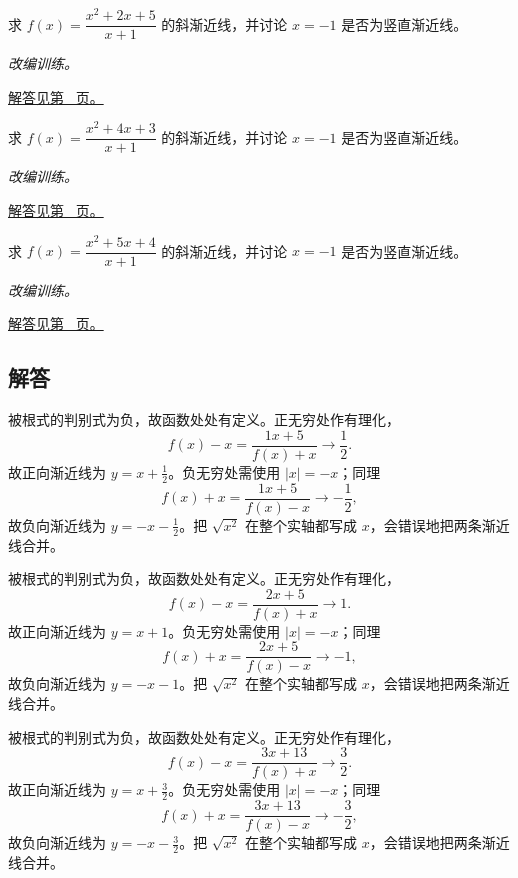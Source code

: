 \documentclass[12pt,fontset=fandol]{ctexart}
\begin{document}
\begin{example}[多项式除法求渐近线]\label{ex:c4q22}
求 $f(x)=\dfrac{x^2+2x+5}{x+1}$ 的斜渐近线，并讨论 $x=-1$ 是否为竖直渐近线。
\par\textit{改编训练。}\par\hyperref[ans:c4q22]{解答见第~\pageref{ans:c4q22} 页。}
\end{example}
\begin{example}[多项式除法求渐近线]\label{ex:c4q23}
求 $f(x)=\dfrac{x^2+4x+3}{x+1}$ 的斜渐近线，并讨论 $x=-1$ 是否为竖直渐近线。
\par\textit{改编训练。}\par\hyperref[ans:c4q23]{解答见第~\pageref{ans:c4q23} 页。}
\end{example}
\begin{example}[多项式除法求渐近线]\label{ex:c4q24}
求 $f(x)=\dfrac{x^2+5x+4}{x+1}$ 的斜渐近线，并讨论 $x=-1$ 是否为竖直渐近线。
\par\textit{改编训练。}\par\hyperref[ans:c4q24]{解答见第~\pageref{ans:c4q24} 页。}
\end{example}
\subsection{解答}
\begin{solve}\label{ans:c4q1}
被根式的判别式为负，故函数处处有定义。正无穷处作有理化，
\[
f(x)-x=\frac{1x+5}{f(x)+x}\longrightarrow \frac{1}{2}.
\]
故正向渐近线为 $y=x+\frac{1}{2}$。负无穷处需使用 $|x|=-x$；同理
\[
f(x)+x=\frac{1x+5}{f(x)-x}\longrightarrow-\frac{1}{2},
\]
故负向渐近线为 $y=-x-\frac{1}{2}$。把 $\sqrt{x^2}$ 在整个实轴都写成 $x$，会错误地把两条渐近线合并。
\end{solve}

\begin{solve}\label{ans:c4q2}
被根式的判别式为负，故函数处处有定义。正无穷处作有理化，
\[
f(x)-x=\frac{2x+5}{f(x)+x}\longrightarrow 1.
\]
故正向渐近线为 $y=x+1$。负无穷处需使用 $|x|=-x$；同理
\[
f(x)+x=\frac{2x+5}{f(x)-x}\longrightarrow-1,
\]
故负向渐近线为 $y=-x-1$。把 $\sqrt{x^2}$ 在整个实轴都写成 $x$，会错误地把两条渐近线合并。
\end{solve}

\begin{solve}\label{ans:c4q3}
被根式的判别式为负，故函数处处有定义。正无穷处作有理化，
\[
f(x)-x=\frac{3x+13}{f(x)+x}\longrightarrow \frac{3}{2}.
\]
故正向渐近线为 $y=x+\frac{3}{2}$。负无穷处需使用 $|x|=-x$；同理
\[
f(x)+x=\frac{3x+13}{f(x)-x}\longrightarrow-\frac{3}{2},
\]
故负向渐近线为 $y=-x-\frac{3}{2}$。把 $\sqrt{x^2}$ 在整个实轴都写成 $x$，会错误地把两条渐近线合并。
\end{solve}
\end{document}
